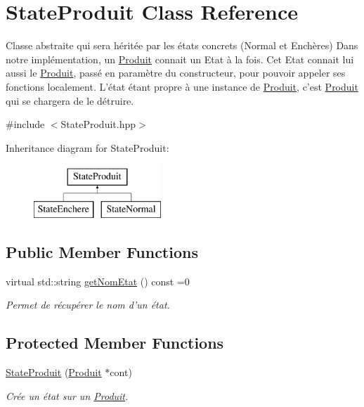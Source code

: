 \hypertarget{classStateProduit}{\section{State\-Produit Class Reference}
\label{classStateProduit}
}


Classe abstraite qui sera héritée par les états concrets (Normal et Enchères) Dans notre implémentation, un \hyperlink{classProduit}{Produit} connait un Etat à la fois. Cet Etat connait lui aussi le \hyperlink{classProduit}{Produit}, passé en paramètre du constructeur, pour pouvoir appeler ses fonctions localement. L'état étant propre à une instance de \hyperlink{classProduit}{Produit}, c'est \hyperlink{classProduit}{Produit} qui se chargera de le détruire.  




{\ttfamily \#include $<$State\-Produit.\-hpp$>$}

Inheritance diagram for State\-Produit\-:\begin{figure}[H]
\begin{center}
\leavevmode
\includegraphics[height=2.000000cm]{classStateProduit}
\end{center}
\end{figure}
\subsection*{Public Member Functions}
\begin{DoxyCompactItemize}
\item 
virtual std\-::string \hyperlink{classStateProduit_aada1a1cc10d67e886b96322683c05411}{get\-Nom\-Etat} () const =0
\begin{DoxyCompactList}\small\item\em Permet de récupérer le nom d'un état. \end{DoxyCompactList}\end{DoxyCompactItemize}
\subsection*{Protected Member Functions}
\begin{DoxyCompactItemize}
\item 
\hyperlink{classStateProduit_ae79072739c68f66c8b39958a376b6c3f}{State\-Produit} (\hyperlink{classProduit}{Produit} $\ast$cont)
\begin{DoxyCompactList}\small\item\em Crée un état sur un \hyperlink{classProduit}{Produit}. \end{DoxyCompactList}\end{DoxyCompactItemize}
